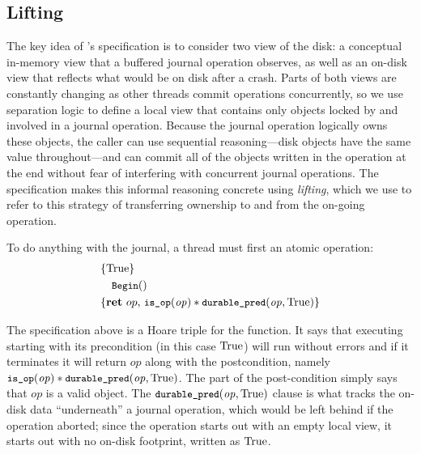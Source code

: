 \subsection{Lifting}
\label{s:design:lifting}

\newcommand{\bufobjDurable}{\cc{durable_pred}\xspace}

The key idea of \txn's specification is to consider two view of the disk: a
conceptual in-memory view that a buffered journal operation observes, as well as
an on-disk view that reflects what would be on disk after a crash. Parts of both views are constantly changing as
other threads commit operations concurrently, so we use separation logic to
define a local view that contains only objects locked by and involved in a
journal operation. Because the journal operation logically owns these objects, the caller
can use sequential reasoning---disk objects have the same value throughout---and can commit all of the objects written in the operation at
the end without fear of interfering with concurrent journal operations. The
specification makes this informal reasoning concrete using \emph{lifting}, which
we use to refer to this strategy of transferring ownership to and from the
on-going operation.

To do anything with the journal, a thread must first  an atomic operation:
\hypertarget{tgt:begin-spec}{}
%
\begin{align*}
  \hoareV{\TRUE}{\cc{Begin}()}{\Ret{op}
    \cc{is_op}(\mathit{op}) \sep
    \bufobjDurable(\mathit{op}, \TRUE)}
\end{align*}

The specification above is a Hoare triple for the  function. It says
that executing  starting with its precondition (in this case $\mathrm{True}$) will run
without errors and if it terminates it will return $\mathit{op}$ along with the
postcondition, namely $\cc{is_op}(\mathit{op}) \sep \bufobjDurable(\mathit{op}, \TRUE)$.
The  part of the post-condition simply says that $\mathit{op}$ is a
valid  object. The $\bufobjDurable(\mathit{op}, \TRUE)$ clause is what tracks the
on-disk data ``underneath'' a journal operation, which would be left behind if the
operation aborted; since the operation starts out with an empty local view,
it starts out with no on-disk footprint, written as $\mathrm{True}$.


